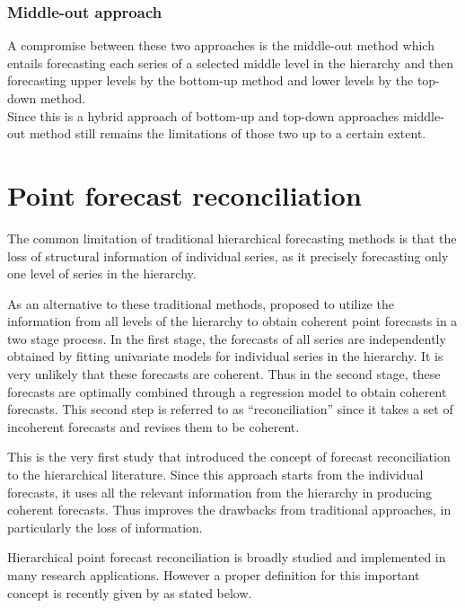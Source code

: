\documentclass[graybox]{svmult}
\begin{document}
\subsubsection{Middle-out approach}

A compromise between these two approaches is the middle-out method which entails forecasting each series of a selected middle level in the hierarchy and then forecasting upper levels by the bottom-up method and lower levels by the top-down method.\\
Since this is a hybrid approach of bottom-up and top-down approaches middle-out method still remains the limitations of those two up to a certain extent. 



\section{Point forecast reconciliation}

The common limitation of traditional hierarchical forecasting methods is that the loss of structural information of individual series, as it precisely forecasting only one level of series in the hierarchy.  

As an alternative to these traditional methods, \citet{hyndman2011} proposed to utilize the information from all levels of the hierarchy to obtain coherent point forecasts in  a two stage process. In the first stage, the forecasts of all series are independently obtained by fitting univariate models for individual series in the hierarchy. It is very unlikely that these forecasts are coherent. Thus in the second stage, these forecasts are optimally combined through a regression model to obtain coherent forecasts. This second step is referred to as ``reconciliation'' since it takes a set of incoherent forecasts and revises them to be coherent.

This is the very first study that introduced the concept of forecast reconciliation to the hierarchical literature. Since this approach starts from the individual forecasts, it uses all the relevant information from the hierarchy in producing coherent forecasts. Thus improves the drawbacks from traditional approaches, in particularly the loss of information. 

Hierarchical point forecast reconciliation is broadly studied and implemented in many research applications. 
However a proper definition for this important concept is recently given by \cite{Gamakumara2018} as stated below.\\   
\end{document}

